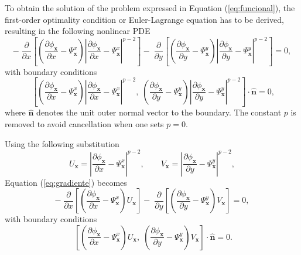 \documentclass[12pt,letterpaper]{article}
\begin{document}
To obtain the solution of the problem expressed in Equation  (\ref{eq:funcional}), the first-order optimality condition or Euler-Lagrange equation has to be derived, resulting in the following nonlinear PDE
\begin{equation}\label{eq:gradiente}
- \;\frac{\partial}{\partial x}\left[\left(\frac{\partial\phi_{\mathbf{x}}}{\partial x} - \Psi_{\mathbf{x}}^{x}\right)
\left\lvert\frac{\partial\phi_{\mathbf{x}}}{\partial x} - \Psi_{\mathbf{x}}^{x}\right\rvert^{p-2} \right] 
- \;\frac{\partial}{\partial y}\left[\left(\frac{\partial\phi_{\mathbf{x}}}{\partial y} - \Psi_{\mathbf{x}}^{y}\right)
\left\lvert\frac{\partial\phi_{\mathbf{x}}}{\partial y} - \Psi_{\mathbf{x}}^{y}\right\rvert^{p-2}\right] = 0,
\end{equation}
with boundary conditions
\[\;\left[ \left(\frac{\partial\phi_{\mathbf{x}}}{\partial x} - \Psi_{\mathbf{x}}^{x}\right)
\left\lvert\frac{\partial\phi_{\mathbf{x}}}{\partial x} - \Psi_{\mathbf{x}}^{x}\right\rvert^{p-2}, \; 
\left(\frac{\partial\phi_{\mathbf{x}}}{\partial y} - \Psi_{\mathbf{x}}^{y}\right)
\left\lvert\frac{\partial\phi_{\mathbf{x}}}{\partial y} - \Psi_{\mathbf{x}}^{y}\right\rvert^{p-2}\right] \cdot \hat{\mathbf{n}} = 0,\]
where $\hat{\mathbf{n}}$ denotes the unit outer normal vector to the boundary. The constant $p$ is removed to avoid cancellation when one sets $p = 0.$

Using the following substitution 
\begin{equation}\label{eq:UV}
U_{\mathbf{x}} = \left\lvert\frac{\partial\phi_{\mathbf{x}}}{\partial x} - \Psi_{\mathbf{x}}^{x}\right\rvert^{p-2},\qquad 
V_{\mathbf{x}} = \left\lvert\frac{\partial\phi_{\mathbf{x}}}{\partial y} - \Psi_{\mathbf{x}}^{y}\right\rvert^{p-2},
\end{equation}
Equation (\ref{eq:gradiente}) becomes 
\begin{equation}\label{eq:gradienteUV}
- \;\frac{\partial}{\partial x}\left[\left(\frac{\partial\phi_{\mathbf{x}}}{\partial x} - \Psi_{\mathbf{x}}^{x}\right) U_{\mathbf{x}} \right] 
- \;\frac{\partial}{\partial y}\left[\left(\frac{\partial\phi_{\mathbf{x}}}{\partial y} - \Psi_{\mathbf{x}}^{y}\right) V_{\mathbf{x}} \right] = 0,
\end{equation}
with boundary conditions
\[\;\left[ \left(\frac{\partial\phi_{\mathbf{x}}}{\partial x} - \Psi_{\mathbf{x}}^{x}\right) U_{\mathbf{x}}, \; 
\left(\frac{\partial\phi_{\mathbf{x}}}{\partial y} - \Psi_{\mathbf{x}}^{y}\right) V_{\mathbf{x}} \right] \cdot \hat{\mathbf{n}} = 0.\]
\end{document}
